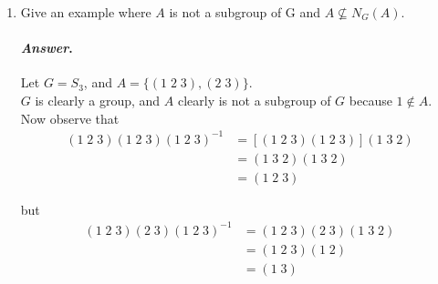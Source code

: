 \documentclass[11pt, reqno]{amsart}
\theoremstyle{plain}
\theoremstyle{definition}
\theoremstyle{example}
\newenvironment{ans}{\color{black}\medskip \paragraph*{\emph{Answer}.}}{\hfill \break  $~\!\!$ \dotfill \medskip }
\begin{document}
\begin{enumerate}[1.]
\begin{enumerate}
\begin{proof}
We can do this by showing that $N_G(H) \leqslant G$. First, $N_G(H) \neq \emptyset$ because $1 \in H \implies 1 \in N_G(H)$.\\

Now assume $x, y \in N_G(H)$. That is, $xHx^{-1} = H$ and $yHy^{-1} = H$.\\

Note that, if we multiply on the left by $y^{-1}$ and on the right by $y$ in the second equality, we get
\begin{align*}
H = y^{-1}Hy
\end{align*}

Hence, $y^{-1} \in N_G(H)$ and $N_G(H)$ is closed under inverses. Now
\begin{align*}
(xy)H(xy)^{-1} &= (xy)H(y^{-1}x^{-1})\\
&= x(yHy^{-1})x^{-1}\
&= xHx^{-1}\\
&= H
\end{align*} 

so $xy \in N_G(H)$ and $N_G(H)$ is closed under product. Hence $N_G(H) \leqslant G$ and so $N_G(H)$ is a group.\\

Since $H \leqslant G$, we know $H$ is a group, and since $H \subset N_G(H)$ and $N_G(H)$ group, we have that
\begin{align*}
H \leqslant N_G(H)
\end{align*}

as required.
\end{proof}

\item Give an example where $A$ is not a subgroup of G and $A \not\subseteq N_G(A)$. 
\begin{ans}
Let $G = S_3$, and $A = \{(1 \; 2 \; 3), (2 \; 3)\}$.\\

$G$ is clearly a group, and $A$ clearly is not a subgroup of $G$ because $1 \not\in A$.\\

Now observe that
\begin{align*}
(1 \; 2 \; 3)(1 \; 2 \; 3)(1 \; 2 \; 3)^{-1} &= [(1 \; 2 \; 3)(1 \; 2 \; 3)](1 \; 3 \; 2)\\
&= (1 \; 3 \; 2)(1 \; 3 \; 2)\\
&= (1 \; 2 \; 3)
\end{align*}

but 
\begin{align*}
(1 \; 2 \; 3)(2 \; 3)(1 \; 2 \; 3)^{-1} &= (1 \; 2 \; 3)(2 \; 3)(1 \; 3 \; 2)\\
&= (1 \; 2 \; 3)(1 \; 2)\\
&= (1 \; 3)
\end{align*}


\end{ans}
\end{enumerate}
\end{enumerate}
\end{document}
